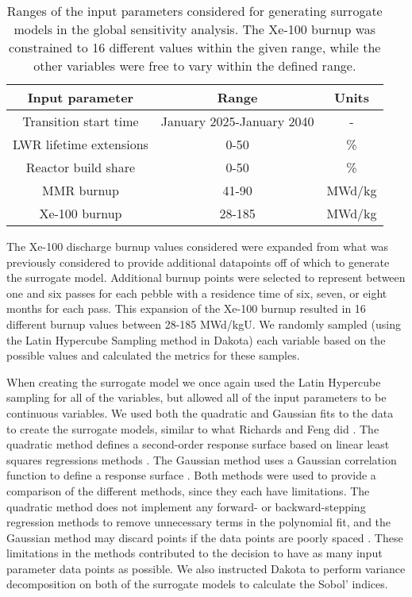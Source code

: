 \begin{table}
    \centering 
    \caption{Ranges of the input parameters considered for generating 
    surrogate models in the global sensitivity analysis. The Xe-100 
    burnup was constrained to 16 different values within the given range, 
    while the other variables were free to vary within the defined range.}
    \label{tab:global_ranges}
    \begin{tabular}{c c c}
        \hline
        Input parameter & Range & Units \\
        \hline 
        Transition start time & January 2025-January 2040 & - \\
        LWR lifetime extensions & 0-50 & \% \\
        Reactor build share & 0-50 & \% \\
        \gls{MMR} burnup & 41-90 & MWd/kg \\
        Xe-100 burnup & 28-185 & MWd/kg \\
        \hline
    \end{tabular}
\end{table}


The Xe-100 discharge burnup values considered were expanded from what 
was previously considered to provide additional datapoints off of which to 
generate the surrogate model. Additional burnup points were selected to represent 
between one and six passes for each pebble with a residence time of six, seven, 
or eight months for each pass. This expansion of the Xe-100 burnup resulted 
in 16 different burnup values between 28-185 MWd/kgU. 
We randomly sampled (using the Latin Hypercube Sampling 
method in Dakota) each variable based on the possible values and 
calculated the metrics for these samples. 

When creating the surrogate model we once again used the Latin Hypercube sampling 
for all of the variables, but allowed all of the input parameters to be continuous 
variables. 
We used both the quadratic and Gaussian fits to the data 
to create the surrogate models, similar to what Richards and 
Feng did \cite{richards_application_2021}. The quadratic method defines a 
second-order response surface based on linear least squares regressions methods 
\cite{adams_dakota_2021}. The Gaussian method uses a Gaussian correlation function 
to define a response surface \cite{adams_dakota_2021}. Both methods were used to 
provide a comparison of the different methods, since they each have limitations. 
The quadratic method does not implement any forward- or backward-stepping regression 
methods to remove unnecessary terms in the polynomial fit, and the Gaussian method 
may discard points if the data points are poorly spaced \cite{adams_dakota_2021}.
These limitations in the methods contributed to the decision to have as many 
input parameter data points as possible. 
We also instructed Dakota to perform variance decomposition 
on both of the surrogate models to calculate the Sobol' indices.

